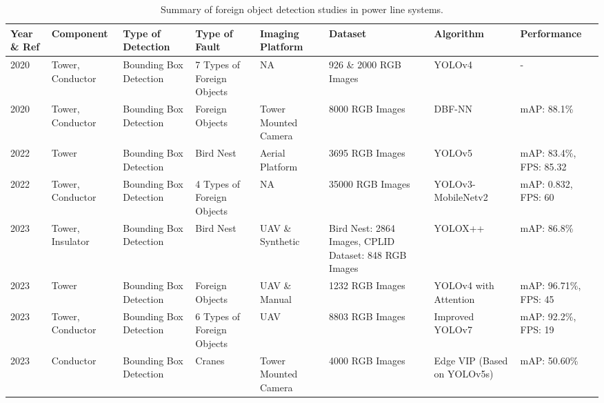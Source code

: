 \begin{table*}[htb]
\scriptsize
\caption{Summary of foreign object detection studies in power line systems.}
\label{tab:foreign_object_detection}
    
\begin{tabular}{P{.05} P{.1} P{.1} P{.1} P{.1} P{.1} P{.1} P{.15}}
\hline  
Year \& Ref & Component & Type of Detection & Type of Fault & Imaging Platform & Dataset & Algorithm & Performance \\ 
\hline 

2020 \cite{zhang_cloud_edge_2020} & Tower, Conductor & Bounding Box Detection & 7 Types of Foreign Objects & NA & 926 \& 2000 RGB Images & YOLOv4 & - \\

2020 \cite{zhu_deep_2020} & Tower, Conductor & Bounding Box Detection & Foreign Objects & Tower Mounted Camera & 8000 RGB Images & DBF-NN & mAP: 88.1\% \\

2022 \cite{ge_birds_2022} & Tower & Bounding Box Detection & Bird Nest & Aerial Platform & 3695 RGB Images & YOLOv5 & mAP: 83.4\%, FPS: 85.32 \\

2022 \cite{li_improved_2022} & Tower, Conductor & Bounding Box Detection & 4 Types of Foreign Objects & NA & 35000 RGB Images & YOLOv3-MobileNetv2 & mAP: 0.832, FPS: 60 \\

2023 \cite{bi_yolox_2023} & Tower, Insulator & Bounding Box Detection & Bird Nest & UAV \& Synthetic & Bird Nest: 2864 Images, CPLID Dataset: 848 RGB Images & YOLOX++ & mAP: 86.8\% \\

2023 \cite{qiu_lightweight_2023} & Tower & Bounding Box Detection & Foreign Objects & UAV \& Manual & 1232 RGB Images & YOLOv4 with Attention & mAP: 96.71\%, FPS: 45 \\

2023 \cite{yu_foreign_2023} & Tower, Conductor & Bounding Box Detection & 6 Types of Foreign Objects & UAV & 8803 RGB Images & Improved YOLOv7 & mAP: 92.2\%, FPS: 19 \\

2023 \cite{zhang_edge_2023} & Conductor & Bounding Box Detection & Cranes & Tower Mounted Camera & 4000 RGB Images & Edge VIP (Based on YOLOv5s) & mAP: 50.60\% \\
\hline

\end{tabular}
\end{table*}


